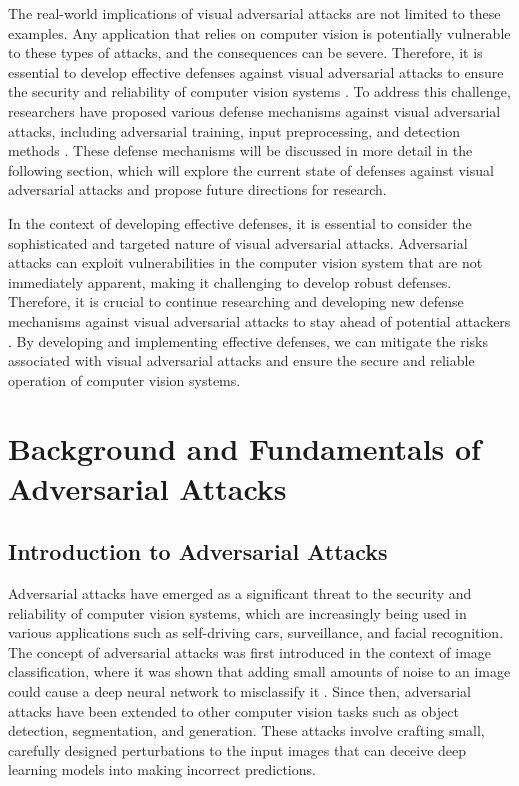 \documentclass[11pt]{article}
\begin{document}
The real-world implications of visual adversarial attacks are not limited to these examples. Any application that relies on computer vision is potentially vulnerable to these types of attacks, and the consequences can be severe. Therefore, it is essential to develop effective defenses against visual adversarial attacks to ensure the security and reliability of computer vision systems \cite{ref4}. To address this challenge, researchers have proposed various defense mechanisms against visual adversarial attacks, including adversarial training, input preprocessing, and detection methods \cite{ref33}. These defense mechanisms will be discussed in more detail in the following section, which will explore the current state of defenses against visual adversarial attacks and propose future directions for research.

In the context of developing effective defenses, it is essential to consider the sophisticated and targeted nature of visual adversarial attacks. Adversarial attacks can exploit vulnerabilities in the computer vision system that are not immediately apparent, making it challenging to develop robust defenses. Therefore, it is crucial to continue researching and developing new defense mechanisms against visual adversarial attacks to stay ahead of potential attackers \cite{ref16}. By developing and implementing effective defenses, we can mitigate the risks associated with visual adversarial attacks and ensure the secure and reliable operation of computer vision systems.

\section{Background and Fundamentals of Adversarial Attacks}

\subsection{Introduction to Adversarial Attacks}

Adversarial attacks have emerged as a significant threat to the security and reliability of computer vision systems, which are increasingly being used in various applications such as self-driving cars, surveillance, and facial recognition. The concept of adversarial attacks was first introduced in the context of image classification, where it was shown that adding small amounts of noise to an image could cause a deep neural network to misclassify it \cite{ref4}. Since then, adversarial attacks have been extended to other computer vision tasks such as object detection, segmentation, and generation. These attacks involve crafting small, carefully designed perturbations to the input images that can deceive deep learning models into making incorrect predictions.
\end{document}
